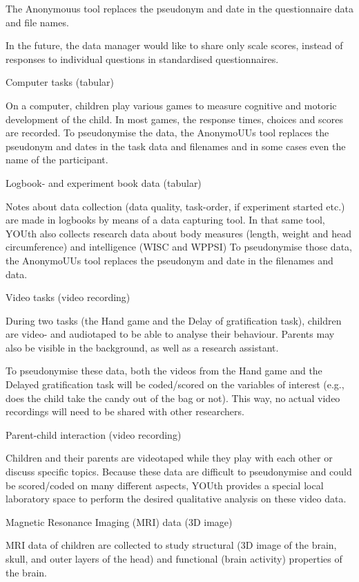 \documentclass[
]{book}
\begin{document}
The Anonymouus tool replaces the pseudonym and date in the questionnaire
data and file names.

In the future, the data manager would like to share only scale scores, instead of responses to individual questions in standardised questionnaires.

Computer tasks (tabular)

On a computer, children play various games to measure cognitive and motoric
development of the child. In most games, the response times, choices and scores
are recorded. To pseudonymise the data, the AnonymoUUs tool replaces the
pseudonym and dates in the task data and filenames and in some cases even the
name of the participant.

Logbook- and experiment book data (tabular)

Notes about data collection (data quality, task-order, if experiment
started etc.) are made in logbooks by means of a data capturing tool. In that
same tool, YOUth also collects research data about body measures (length, weight
and head circumference) and intelligence (WISC and WPPSI) To pseudonymise those
data, the AnonymoUUs tool replaces the pseudonym and date in the filenames and
data.

Video tasks (video recording)

During two tasks (the Hand game and the Delay of gratification task),
children are video- and audiotaped to be able to analyse their behaviour. Parents
may also be visible in the background, as well as a research assistant.

To pseudonymise these data, both the videos from the Hand game and the Delayed
gratification task will be coded/scored on the variables of interest (e.g., does
the child take the candy out of the bag or not). This way, no actual video
recordings will need to be shared with other researchers.

Parent-child interaction (video recording)

Children and their parents are videotaped while they play with each other
or discuss specific topics. Because these data are difficult to pseudonymise and
could be scored/coded on many different aspects, YOUth provides a special local
laboratory space to perform the desired qualitative analysis on these video
data.

Magnetic Resonance Imaging (MRI) data (3D image)

MRI data of children are collected to study structural (3D image of the
brain, skull, and outer layers of the head) and functional (brain activity)
properties of the brain.
\end{document}
